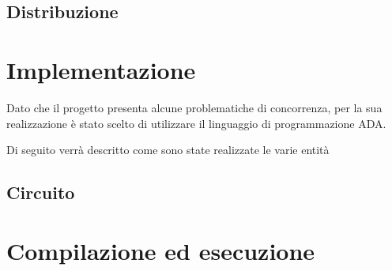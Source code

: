 \documentclass[a4paper,11pt, twoside]{book}
\begin{document}
    \section{Distribuzione}
        
  \chapter{Implementazione}
    Dato che il progetto presenta alcune problematiche di concorrenza, per la sua realizzazione è stato scelto
    di utilizzare il linguaggio di programmazione ADA.
    
    Di seguito verrà descritto come sono state realizzate le varie entità
    
    \section{Circuito}
      
  
  \chapter{Compilazione ed esecuzione}
\end{document}
